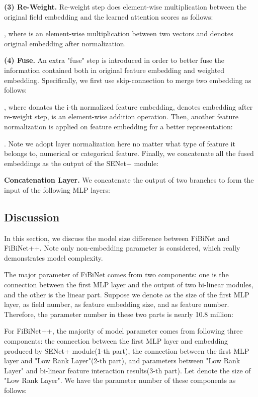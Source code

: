 \documentclass[sigconf]{acmart}
\begin{document}
\textbf{(3) Re-Weight.} Re-weight step does element-wise multiplication between the original field embedding and the learned attention scores as follows:

, where   is an element-wise multiplication between two vectors and  denotes original embedding after normalization.

\textbf{(4) Fuse.} An extra "fuse" step is introduced in order to better fuse the information contained both in original feature embedding and weighted embedding. Specifically, we first use skip-connection to merge two embedding as follows:

, where  donates the i-th normalized feature embedding,  denotes embedding after re-weight step,  is an element-wise addition operation. Then, another feature normalization is applied on feature embedding  for a better representation:

. Note we adopt layer normalization here no matter what type of feature it belongs to, numerical  or categorical feature. Finally, we concatenate all the fused embeddings as the output of the SENet+ module:
      

\textbf{Concatenation Layer.}
We concatenate the output of two branches to form the input of the following MLP layers:



\subsection{Discussion}
In this section, we discuss the model size difference  between FiBiNet and FiBiNet++. Note only non-embedding parameter is considered, which really demonstrates model complexity.

The major parameter of FiBiNet comes from two components: one is the connection between the first MLP layer and the output of two bi-linear modules, and the other is the linear part. Suppose we denote  as the size of the first MLP layer,  as field number,  as feature embedding size, and   as feature number. Therefore, the parameter number in these two parts is nearly 10.8 million:

For FiBiNet++, the majority of model parameter comes from following three components: the connection between the first MLP layer and embedding produced by SENet+ module(1-th part), the connection between the first MLP layer and "Low Rank Layer"(2-th part), and parameters between "Low Rank Layer" and bi-linear feature interaction results(3-th part). Let  denote the size of "Low Rank Layer". We have the parameter number of these components as follows:
\end{document}

